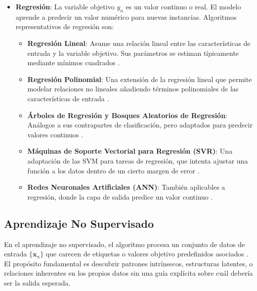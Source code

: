 \begin{itemize}
    \item \textbf{Regresión}: La variable objetivo $y_n$ es un valor continuo o real. El modelo aprende a predecir un valor numérico para nuevas instancias.
     Algoritmos representativos de regresión son:
    \begin{itemize}
        \item \textbf{Regresión Lineal}: Asume una relación lineal entre las características de entrada y la variable objetivo. Sus parámetros se estiman típicamente mediante mínimos cuadrados \citep{Galton1886regression, Montgomery2021}.
        \item \textbf{Regresión Polinomial}: Una extensión de la regresión lineal que permite modelar relaciones no lineales añadiendo términos polinomiales de las características de entrada \citep{Hastie2009}.
        \item \textbf{Árboles de Regresión y Bosques Aleatorios de Regresión}: Análogos a sus contrapartes de clasificación, pero adaptados para predecir valores continuos \citep{Breiman1984cart, Breiman2001random}.
        \item \textbf{Máquinas de Soporte Vectorial para Regresión (SVR)}: Una adaptación de las SVM para tareas de regresión, que intenta ajustar una función a los datos dentro de un cierto margen de error \citep{Drucker1997support}.
        \item \textbf{Redes Neuronales Artificiales (ANN)}: También aplicables a regresión, donde la capa de salida predice un valor continuo \citep[e.g.,][]{Goodfellow2016}.
    \end{itemize}
\end{itemize}

\subsection{Aprendizaje No Supervisado}
\label{subsec:NoSupervisado}
En el aprendizaje no supervisado, el algoritmo procesa un conjunto de datos de entrada $\{\mathbf{x}_n\}$ que carecen de etiquetas o valores objetivo predefinidos asociados \citep{Barlow1989, Hastie2009}. El propósito fundamental es descubrir patrones intrínsecos, estructuras latentes, o relaciones inherentes en los propios datos sin una guía explícita sobre cuál debería ser la salida esperada.

